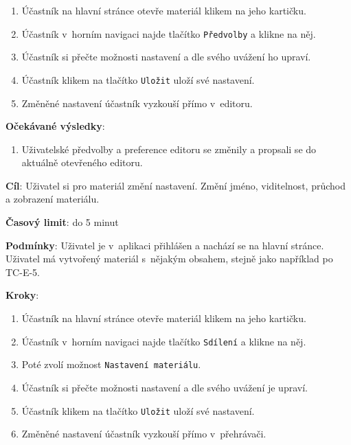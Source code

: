 \begin{enumerate}[leftmargin=1.4cm]
    \item Účastník na hlavní stránce otevře materiál klikem na jeho kartičku.
    \item Účastník v~horním navigaci najde tlačítko \verb|Předvolby| a klikne na něj.
    \item Účastník si přečte možnosti nastavení a dle svého uvážení ho upraví. 
    \item Účastník klikem na tlačítko \verb|Uložit| uloží své nastavení.
    \item Změněné nastavení účastník vyzkouší přímo v~editoru.
\end{enumerate}

\textbf{Očekávané výsledky}:

\begin{enumerate}[leftmargin=1.4cm]
    \item Uživatelské předvolby a preference editoru se změnily a propsali se do aktuálně otevřeného editoru. 
\end{enumerate}




\vspace{1em}

\textbf{Cíl}: Uživatel si pro materiál změní nastavení. Změní jméno, viditelnost, průchod a zobrazení materiálu.

\textbf{Časový limit}: do 5 minut

\textbf{Podmínky}:  Uživatel je v~aplikaci přihlášen a nachází se na hlavní stránce.  Uživatel má vytvořený materiál s~nějakým obsahem, stejně jako například po TC-E-5.

\textbf{Kroky}:

\begin{enumerate}[leftmargin=1.4cm]
    \item Účastník na hlavní stránce otevře materiál klikem na jeho kartičku.
    \item Účastník v~horním navigaci najde tlačítko \verb|Sdílení| a klikne na něj.
    \item Poté zvolí možnost \verb|Nastavení materiálu|.
    \item Účastník si přečte možnosti nastavení a dle svého uvážení je upraví. 
    \item Účastník klikem na tlačítko \verb|Uložit| uloží své nastavení.
    \item Změněné nastavení účastník vyzkouší přímo v~přehrávači.
\end{enumerate}

